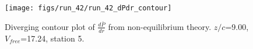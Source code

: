 \begin{figure}[H]
\centering
\texttt{[image: figs/run\_42/run\_42\_dPdr\_contour]}
\caption{Diverging contour plot of $\frac{d\bar{P}}{dr}$ from non-equilibrium theory. $z/c$=9.00, $V_{free}$=17.24, station 5.}
\label{fig:run_42_dPdr_contour}
\end{figure}


